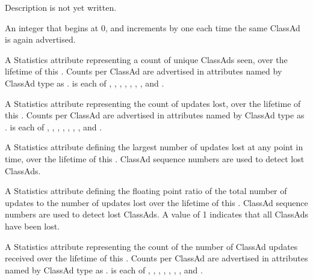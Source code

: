 \begin{description}
\item[\AdAttr{UpdateInterval}:] Description is not yet written.

\item[\AdAttr{UpdateSequenceNumber}:] An integer that begins at 0,
   and increments by one each time the same ClassAd is again advertised.

\item[\AdAttr{UpdatesInitial}:] A Statistics attribute representing
  a count of unique ClassAds seen,
  over the lifetime of this .
  Counts per ClassAd are advertised in attributes named by ClassAd type
  as .
   is each of , ,
  , , , ,
  , and .

\item[\AdAttr{UpdatesLost}:] A Statistics attribute representing
  the count of updates lost,
  over the lifetime of this .
  Counts per ClassAd are advertised in attributes named by ClassAd type
  as .
   is each of , ,
  , , , ,
  , and .

\item[\AdAttr{UpdatesLostMax}:] A Statistics attribute defining
  the largest number of updates lost at any point in time, 
  over the lifetime of this .
  ClassAd sequence numbers are used to detect lost ClassAds.

\item[\AdAttr{UpdatesLostRatio}:] A Statistics attribute defining
  the floating point ratio of the total number of updates to
  the number of updates lost 
  over the lifetime of this .
  ClassAd sequence numbers are used to detect lost ClassAds.
  A value of 1 indicates that all ClassAds have been lost.

\item[\AdAttr{UpdatesTotal}:] A Statistics attribute representing the
  count of the number of ClassAd updates received
  over the lifetime of this .
  Counts per ClassAd are advertised in attributes named by ClassAd type
  as .
   is each of , ,
  , , , ,
  , and .

\end{description}

